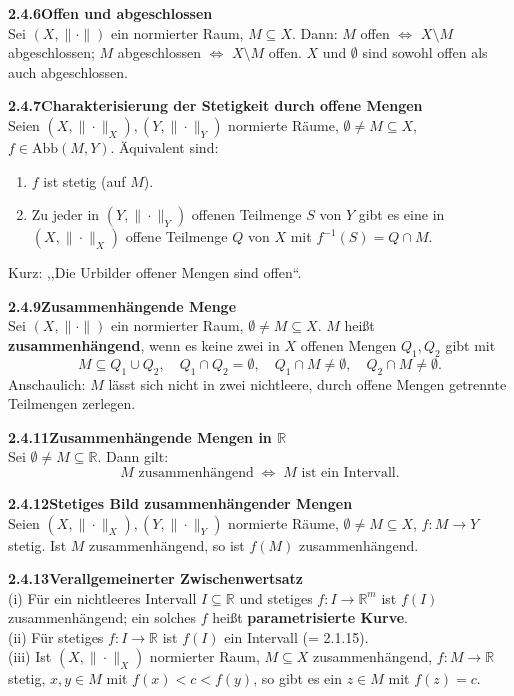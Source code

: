 \documentclass[a4paper,12pt]{article}
\newcommand{\gentry}[3]{%
  \noindent\textbf{#1\quad #2}\nopagebreak\\[0.2em]
  #3\par\smallskip
}
\begin{document}
\gentry{2.4.6}{Offen und abgeschlossen}{%
  Sei $(X, \|\cdot\|)$ ein normierter Raum, $M \subseteq X$. Dann:
  $M$ offen $\Leftrightarrow$ $X \setminus M$ abgeschlossen;
  $M$ abgeschlossen $\Leftrightarrow$ $X \setminus M$ offen.
  $X$ und $\emptyset$ sind sowohl offen als auch abgeschlossen.
}

\gentry{2.4.7}{Charakterisierung der Stetigkeit durch offene Mengen}{%
  Seien $(X, \|\cdot\|_X), (Y, \|\cdot\|_Y)$ normierte Räume, $\emptyset \neq M \subseteq X$,
  $f \in \mathrm{Abb}(M, Y)$. Äquivalent sind:
  \begin{enumerate}[label=(\roman*),topsep=2pt,itemsep=1pt]
    \item $f$ ist stetig (auf $M$).
    \item Zu jeder in $(Y, \|\cdot\|_Y)$ offenen Teilmenge $S$ von $Y$ gibt es
          eine in $(X, \|\cdot\|_X)$ offene Teilmenge $Q$ von $X$ mit
          $f^{-1}(S) = Q \cap M$.
  \end{enumerate}
  Kurz: ,,Die Urbilder offener Mengen sind offen``.
}

\gentry{2.4.9}{Zusammenhängende Menge}{%
  Sei $(X, \|\cdot\|)$ ein normierter Raum, $\emptyset \neq M \subseteq X$.
  $M$ heißt \textbf{zusammenhängend}, wenn es keine zwei in $X$ offenen Mengen
  $Q_1, Q_2$ gibt mit
  \[
    M \subseteq Q_1 \cup Q_2,\quad Q_1 \cap Q_2 = \emptyset,\quad
    Q_1 \cap M \neq \emptyset,\quad Q_2 \cap M \neq \emptyset.
  \]
  Anschaulich: $M$ lässt sich nicht in zwei nichtleere, durch offene Mengen
  getrennte Teilmengen zerlegen.
}

\gentry{2.4.11}{Zusammenhängende Mengen in $\mathbb{R}$}{%
  Sei $\emptyset \neq M \subseteq \mathbb{R}$. Dann gilt:
  \[
    M \text{ zusammenhängend} \;\Longleftrightarrow\; M \text{ ist ein Intervall}.
  \]
}

\gentry{2.4.12}{Stetiges Bild zusammenhängender Mengen}{%
  Seien $(X, \|\cdot\|_X), (Y, \|\cdot\|_Y)$ normierte Räume, $\emptyset \neq M \subseteq X$,
  $f: M \to Y$ stetig. Ist $M$ zusammenhängend, so ist $f(M)$ zusammenhängend.
}

\gentry{2.4.13}{Verallgemeinerter Zwischenwertsatz}{%
  (i) Für ein nichtleeres Intervall $I \subseteq \mathbb{R}$ und stetiges
  $f: I \to \mathbb{R}^m$ ist $f(I)$ zusammenhängend; ein solches $f$ heißt
  \textbf{parametrisierte Kurve}.\\
  (ii) Für stetiges $f: I \to \mathbb{R}$ ist $f(I)$ ein Intervall (= 2.1.15).\\
  (iii) Ist $(X, \|\cdot\|_X)$ normierter Raum, $M \subseteq X$ zusammenhängend,
  $f: M \to \mathbb{R}$ stetig, $x, y \in M$ mit $f(x) < c < f(y)$, so gibt es
  ein $z \in M$ mit $f(z) = c$.
}
\end{document}
